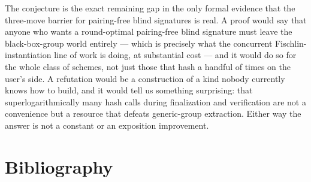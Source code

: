 \documentclass{aicr-conjecture}
\begin{document}
\begin{remark}\label{rem:consequence}
The conjecture is the exact remaining gap in the only formal evidence
that the three-move barrier for pairing-free blind signatures is real. A
proof would say that anyone who wants a round-optimal pairing-free blind
signature must leave the black-box-group world entirely --- which is
precisely what the concurrent Fischlin-instantiation line of work is
doing, at substantial cost --- and it would do so for the whole class of
schemes, not just those that hash a handful of times on the user's side.
A refutation would be a construction of a kind nobody currently knows
how to build, and it would tell us something surprising: that
superlogarithmically many hash calls during finalization and
verification are not a convenience but a resource that defeats
generic-group extraction. Either way the answer is not a constant or an
exposition improvement.
\end{remark}

\section{Bibliography}
\end{document}
